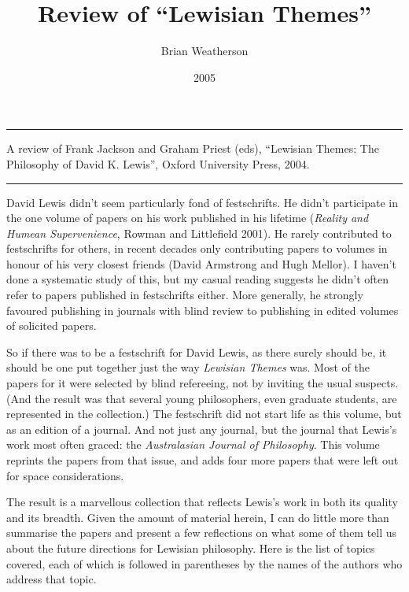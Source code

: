 \documentclass[
  10pt,
  letterpaper,
  DIV=11,
  numbers=noendperiod,
  twoside]{scrartcl}
\title{Review of ``Lewisian Themes''}
\author{Brian Weatherson}
\date{2005}
\renewenvironment{abstract}
 {\vspace{-1.25cm}
 \quotation\small\noindent\rule{\linewidth}{.5pt}\par\smallskip
 \noindent }
 {\par\noindent\rule{\linewidth}{.5pt}\endquotation}
\begin{document}
\maketitle
\begin{abstract}
A review of Frank Jackson and Graham Priest (eds), ``Lewisian Themes:
The Philosophy of David K. Lewis'', Oxford University Press, 2004.
\end{abstract}

David Lewis didn't seem particularly fond of festschrifts. He didn't
participate in the one volume of papers on his work published in his
lifetime (\emph{Reality and Humean Supervenience}, Rowman and
Littlefield 2001). He rarely contributed to festschrifts for others, in
recent decades only contributing papers to volumes in honour of his very
closest friends (David Armstrong and Hugh Mellor). I haven't done a
systematic study of this, but my casual reading suggests he didn't often
refer to papers published in festschrifts either. More generally, he
strongly favoured publishing in journals with blind review to publishing
in edited volumes of solicited papers.

So if there was to be a festschrift for David Lewis, as there surely
should be, it should be one put together just the way \emph{Lewisian
Themes} was. Most of the papers for it were selected by blind
refereeing, not by inviting the usual suspects. (And the result was that
several young philosophers, even graduate students, are represented in
the collection.) The festschrift did not start life as this volume, but
as an edition of a journal. And not just any journal, but the journal
that Lewis's work most often graced: the \emph{Australasian Journal of
Philosophy}. This volume reprints the papers from that issue, and adds
four more papers that were left out for space considerations.

The result is a marvellous collection that reflects Lewis's work in both
its quality and its breadth. Given the amount of material herein, I can
do little more than summarise the papers and present a few reflections
on what some of them tell us about the future directions for Lewisian
philosophy. Here is the list of topics covered, each of which is
followed in parentheses by the names of the authors who address that
topic.
\end{document}
